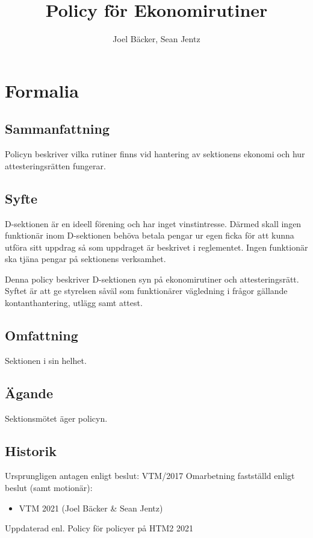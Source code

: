 \documentclass{dsekprotokoll}
\title{Policy för Ekonomirutiner}
\author{Joel Bäcker, Sean Jentz}
\begin{document}
\maketitle
\section{Formalia}
\subsection{Sammanfattning}
Policyn beskriver vilka rutiner finns vid hantering av sektionens ekonomi och hur attesteringsrätten fungerar.
\subsection{Syfte}
D-sektionen är en ideell förening och har inget vinstintresse. Därmed skall ingen funktionär inom D-sektionen behöva betala pengar ur egen ficka för att kunna utföra sitt uppdrag så som uppdraget är beskrivet i reglementet. Ingen funktionär ska tjäna pengar på sektionens verksamhet.

\par Denna policy beskriver D-sektionen syn på ekonomirutiner och attesteringsrätt. Syftet är att ge styrelsen såväl som funktionärer vägledning i frågor gällande kontanthantering, utlägg samt attest.
\subsection{Omfattning}
Sektionen i sin helhet.
\subsection{Ägande}
Sektionsmötet äger policyn.
\subsection{Historik}
Ursprungligen antagen enligt beslut: VTM/2017
Omarbetning fastställd enligt beslut (samt motionär):
\begin{itemize}
    \item VTM 2021 (Joel Bäcker \& Sean Jentz)
\end{itemize}
Uppdaterad enl. Policy för policyer på HTM2 2021


\end{document}
